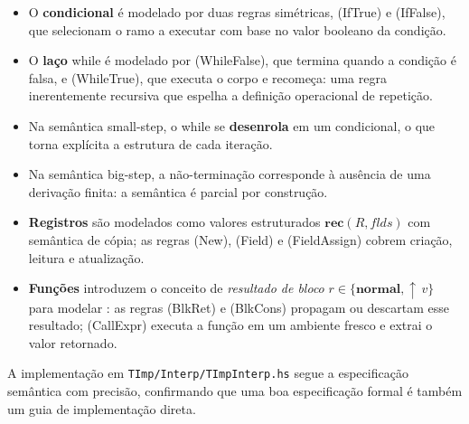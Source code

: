 \begin{itemize}
  \item
    O \textbf{condicional} é modelado por duas regras simétricas,
    (IfTrue) e (IfFalse), que selecionam o ramo a executar com base
    no valor booleano da condição.
  \item
    O \textbf{laço} while é modelado por
    (WhileFalse), que termina quando a condição é falsa, e
    (WhileTrue), que executa o corpo e recomeça: uma regra
    inerentemente recursiva que espelha a definição operacional
    de repetição.
  \item
    Na semântica small-step, o while se
    \textbf{desenrola} em um condicional, o que torna explícita a
    estrutura de cada iteração.
  \item
    Na semântica big-step, a não-terminação corresponde à ausência de
    uma derivação finita: a semântica é parcial por construção.
  \item
    \textbf{Registros} são modelados como valores estruturados
    \(\mathbf{rec}(R, \mathit{flds})\) com semântica de cópia; as regras
    (New), (Field) e (FieldAssign) cobrem criação, leitura e atualização.
  \item
    \textbf{Funções} introduzem o conceito de \textit{resultado de bloco}
    \(r \in \{\mathbf{normal}, {\uparrow}\,v\}\) para modelar
    : as regras (BlkRet) e (BlkCons) propagam ou
    descartam esse resultado; (CallExpr) executa a função em um ambiente
    fresco e extrai o valor retornado.
\end{itemize}

A implementação em \verb|TImp/Interp/TImpInterp.hs| segue a
especificação semântica com precisão, confirmando que uma boa
especificação formal é também um guia de implementação direta.
